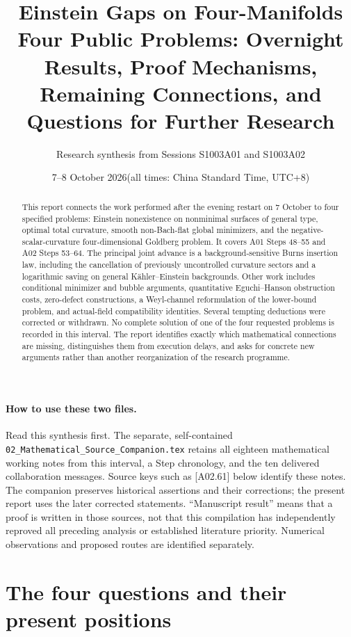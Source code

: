 \documentclass[11pt]{article}
\title{Einstein Gaps on Four-Manifolds\\[4pt]
\large Four Public Problems: Overnight Results, Proof Mechanisms,\\
Remaining Connections, and Questions for Further Research}
\author{Research synthesis from Sessions S1003A01 and S1003A02}
\date{7--8 October 2026\quad (all times: China Standard Time, UTC+8)}
\newcommand{\sref}[1]{\textsf{[#1]}}
\theoremstyle{remark}
\begin{document}
\maketitle

\begin{abstract}
This report connects the work performed after the evening restart on
7 October to four specified problems: Einstein nonexistence on nonminimal
surfaces of general type, optimal total curvature, smooth non-Bach-flat
global minimizers, and the negative-scalar-curvature four-dimensional
Goldberg problem. It covers A01 Steps 48--55 and A02 Steps 53--64.
The principal joint advance is a background-sensitive Burns insertion law,
including the cancellation of previously uncontrolled curvature sectors and
a logarithmic saving on general K\"ahler--Einstein backgrounds. Other work
includes conditional minimizer and bubble arguments, quantitative
Eguchi--Hanson obstruction costs, zero-defect constructions, a Weyl-channel
reformulation of the lower-bound problem, and actual-field compatibility
identities. Several tempting deductions were corrected or withdrawn.
No complete solution of one of the four requested problems is recorded in
this interval. The report identifies exactly which mathematical connections
are missing, distinguishes them from execution delays, and asks for concrete
new arguments rather than another reorganization of the research programme.
\end{abstract}

\paragraph{How to use these two files.}
Read this synthesis first. The separate, self-contained
\texttt{02\_Mathematical\_Source\_Companion.tex} retains all eighteen
mathematical working notes from this interval, a Step chronology, and the ten
delivered collaboration messages. Source keys such as \sref{A02.61} below
identify these notes. The companion preserves historical assertions and their
corrections; the present report uses the later corrected statements.
``Manuscript result'' means that a proof is written in those sources, not that
this compilation has independently reproved all preceding analysis or
established literature priority. Numerical observations and proposed routes
are identified separately.

\tableofcontents

\section{The four questions and their present positions}
\label{sec:four}
\end{document}
